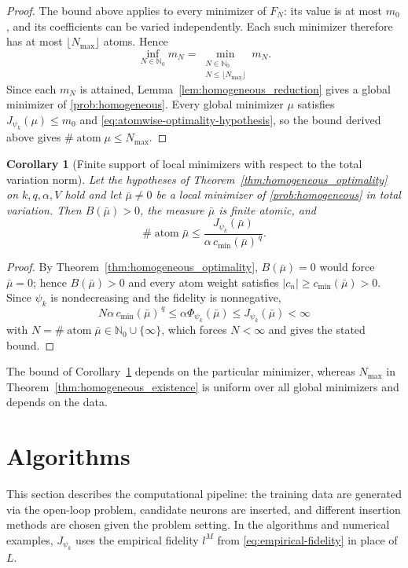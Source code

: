 \documentclass[11pt]{amsart}
\newtheorem{corollary}[theorem]{Corollary}
\theoremstyle{definition}
\theoremstyle{remark}
\DeclareMathOperator{\atom}{atom}
\begin{document}
\begin{proof}
The bound above applies to every minimizer of $F_N$: its value is at most
$m_0$, and its coefficients can be varied independently. Each such minimizer
therefore has at most $\lfloor N_{\max}\rfloor$ atoms. Hence
\begin{equation*}
	\inf_{N\in\mathbb N_0}m_N
	=\min_{\substack{N\in\mathbb N_0\\N\le\lfloor N_{\max}\rfloor}}m_N.
\end{equation*}
Since each $m_N$ is attained, Lemma~\ref{lem:homogeneous_reduction}
gives a global minimizer of \eqref{prob:homogeneous}.
Every global minimizer $\mu$ satisfies $J_{\psi_k}(\mu)\le m_0$
and \eqref{eq:atomwise-optimality-hypothesis}, so the bound derived
above gives $\#\atom\mu\le N_{\max}$.
\end{proof}

\begin{corollary}[Finite support of local minimizers with respect to the total
variation norm]
\label{cor:homogeneous_local_support}
Let the hypotheses of Theorem~\ref{thm:homogeneous_optimality} on
$k,q,\alpha,V$ hold and let $\bar\mu\ne0$ be a local minimizer of
\eqref{prob:homogeneous} in total variation. Then $B(\bar\mu)>0$, the measure
$\bar\mu$ is finite atomic, and
\begin{equation*}
	\#\atom\bar\mu\le\frac{J_{\psi_k}(\bar\mu)}
	         {\alpha\,c_{\min}(\bar\mu)^{\,q}} .
\end{equation*}
\end{corollary}
\begin{proof}
By Theorem~\ref{thm:homogeneous_optimality}, $B(\bar\mu)=0$ would force
$\bar\mu=0$; hence $B(\bar\mu)>0$ and every atom weight satisfies
$|c_n|\ge c_{\min}(\bar\mu)>0$. Since $\psi_k$ is nondecreasing and the
fidelity is nonnegative,
\begin{equation*}
	N\alpha\,c_{\min}(\bar\mu)^{\,q}
	\le\alpha\Phi_{\psi_k}(\bar\mu)
	\le J_{\psi_k}(\bar\mu)<\infty
\end{equation*}
with $N=\#\atom\bar\mu\in\mathbb N_0\cup\{\infty\}$, which forces
$N<\infty$ and gives the stated bound.
\end{proof}

The bound of Corollary~\ref{cor:homogeneous_local_support} depends on the
particular minimizer, whereas $N_{\max}$ in
Theorem~\ref{thm:homogeneous_existence} is uniform over all global minimizers and depends on the data.

\section{Algorithms}
This section describes the computational pipeline: the training data are
generated via the open-loop problem, candidate neurons are inserted,
and different insertion methods are chosen given the problem setting.
In the algorithms and numerical examples, $J_{\psi_k}$ uses the empirical
fidelity $l^M$ from \eqref{eq:empirical-fidelity} in place of $L$.
\end{document}
